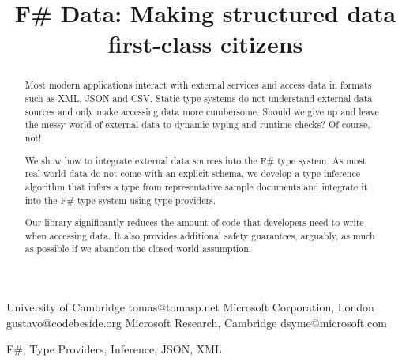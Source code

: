 \documentclass[10pt,preprint,clearpagebib]{sigplanconf}
\newcommand{\doi}[1]{doi:~\href{http://dx.doi.org/#1}{\Hurl{#1}}}
\begin{document}
\setlength{\pdfpageheight}{\paperheight}
\setlength{\pdfpagewidth}{\paperwidth}


\title{F\# Data: \textnormal{Making structured data first-class citizens}}

           {University of Cambridge}
           {tomas@tomasp.net}
           {Microsoft Corporation, London}
           {gustavo@codebeside.org}
           {Microsoft Research, Cambridge}
           {dsyme@microsoft.com}
\maketitle


\begin{abstract}
Most modern applications interact with external services and access data in formats such as 
XML, JSON and CSV. Static type systems do not understand external data sources and only 
make accessing data more cumbersome. Should we give up and leave the messy world of external data 
to dynamic typing and runtime checks? Of course, not!

We show how to integrate external data sources into the F\# type system. As most real-world data
do not come with an explicit schema, we develop a type inference algorithm that infers a type from 
representative sample documents and integrate it into the F\# type system using type providers.

Our library significantly reduces the amount of code that developers need to write when 
accessing data. It also provides additional safety guarantees, arguably, as much as possible if 
we abandon the closed world assumption.
\end{abstract}

\keywords F\#, Type Providers, Inference, JSON, XML
\end{document}
